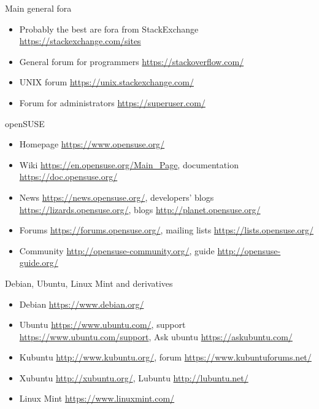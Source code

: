 \documentclass[compress, ucs, xelatex, 11pt, xcolor=svgnames,
  hyperref={
    bookmarks=true,
    unicode=true,
    colorlinks=true,
    pdftitle={Linux, command line and MetaCentrum},
    plainpages=false,
    pdfauthor={Vojtech Zeisek},
    pdfsubject={Course about use of Linux command line, writing shell scripts and using MetaCentrum of CESNET},
    pdfcreator={XeLaTeX},
    pdfkeywords={Linux, GNU, BASH, shell, command line, MetaCentrum},
    linkcolor=DarkRed,
    anchorcolor=DarkBlue,
    citecolor=Indigo,
    filecolor=NavyBlue,
    menucolor=DarkMagenta,
    urlcolor=DarkBlue,
    pdftex},
  url={hyphens, lowtilde} %
  ]{beamer}
\begin{document}
\begin{frame}{Main general fora}
  \begin{itemize}
    \item Probably the best are fora from StackExchange \url{https://stackexchange.com/sites}
    \item General forum for programmers \url{https://stackoverflow.com/}
    \item UNIX forum \url{https://unix.stackexchange.com/}
    \item Forum for administrators \url{https://superuser.com/}
  \end{itemize}
\end{frame}

\begin{frame}{openSUSE}
  \begin{itemize}
    \item Homepage \url{https://www.opensuse.org/}
    \item Wiki \url{https://en.opensuse.org/Main_Page}, documentation \url{https://doc.opensuse.org/}
    \item News \url{https://news.opensuse.org/}, developers' blogs \url{https://lizards.opensuse.org/}, blogs \url{http://planet.opensuse.org/}
    \item Forums \url{https://forums.opensuse.org/}, mailing lists \url{https://lists.opensuse.org/}
    \item Community \url{http://opensuse-community.org/}, guide \url{http://opensuse-guide.org/}
  \end{itemize}
\end{frame}

\begin{frame}{Debian, Ubuntu, Linux Mint and derivatives}
  \begin{itemize}
    \item Debian \url{https://www.debian.org/}
    \item Ubuntu \url{https://www.ubuntu.com/}, support \url{https://www.ubuntu.com/support}, Ask ubuntu \url{https://askubuntu.com/}
    \item Kubuntu \url{http://www.kubuntu.org/}, forum \url{https://www.kubuntuforums.net/}
    \item Xubuntu \url{http://xubuntu.org/}, Lubuntu \url{http://lubuntu.net/}
    \item Linux Mint \url{https://www.linuxmint.com/}
  \end{itemize}
\end{frame}
\end{document}
